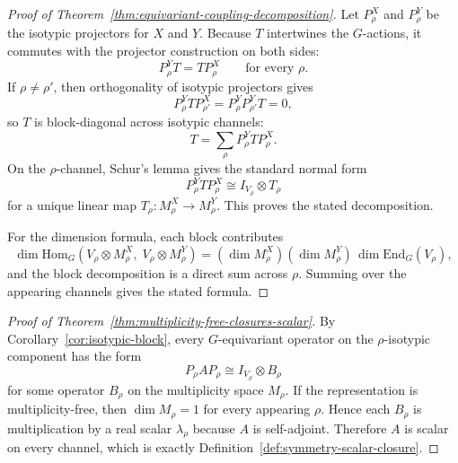 \begin{proof}[Proof of Theorem~\ref{thm:equivariant-coupling-decomposition}]
\label{proof:thm:equivariant-coupling-decomposition}
Let $P_\rho^X$ and $P_\rho^Y$ be the isotypic projectors for $X$ and $Y$.
Because $T$ intertwines the $G$-actions, it commutes with the projector
construction on both sides:
\[
P_\rho^Y T = T P_\rho^X
\qquad\text{for every }\rho.
\]
If $\rho\neq \rho'$, then orthogonality of isotypic projectors gives
\[
P_\rho^Y T P_{\rho'}^X = P_\rho^Y P_{\rho'}^Y T = 0,
\]
so $T$ is block-diagonal across isotypic channels:
\[
T=\sum_\rho P_\rho^Y T P_\rho^X.
\]
On the $\rho$-channel, Schur's lemma gives the standard normal form
\[
P_\rho^Y T P_\rho^X \cong I_{V_\rho}\otimes T_\rho
\]
for a unique linear map $T_\rho:M_\rho^X\to M_\rho^Y$. This proves the stated
decomposition.

For the dimension formula, each block contributes
\[
\dim \mathrm{Hom}_G(V_\rho\otimes M_\rho^X,\;V_\rho\otimes M_\rho^Y)
=
(\dim M_\rho^X)(\dim M_\rho^Y)\,\dim \mathrm{End}_G(V_\rho),
\]
and the block decomposition is a direct sum across $\rho$. Summing over the
appearing channels gives the stated formula.
\end{proof}

\begin{proof}[Proof of Theorem~\ref{thm:multiplicity-free-closures-scalar}]
\label{proof:thm:multiplicity-free-closures-scalar}
By Corollary~\ref{cor:isotypic-block}, every $G$-equivariant operator on the
$\rho$-isotypic component has the form
\[
P_{\rho}AP_{\rho}\cong I_{V_{\rho}}\otimes B_{\rho}
\]
for some operator $B_{\rho}$ on the multiplicity space $M_{\rho}$. If the
representation is multiplicity-free, then $\dim M_{\rho}=1$ for every appearing
$\rho$. Hence each $B_{\rho}$ is multiplication by a real scalar
$\lambda_{\rho}$ because $A$ is self-adjoint. Therefore $A$ is scalar on every
channel, which is exactly Definition~\ref{def:symmetry-scalar-closure}.
\end{proof}


